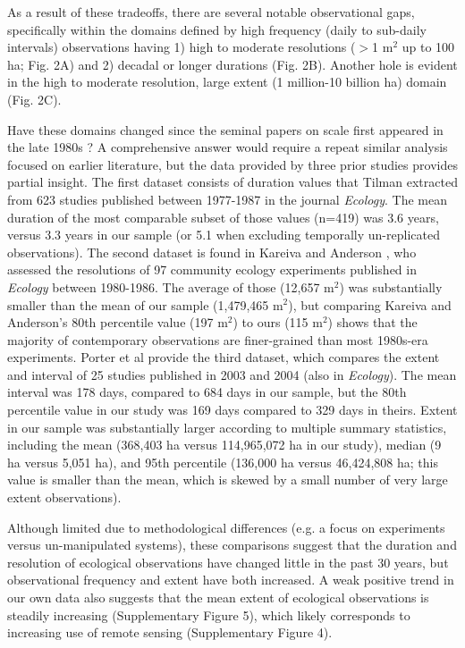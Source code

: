 \documentclass[12pt]{article}
\begin{document}
As a result of these tradeoffs, there are several notable observational gaps, specifically within the domains defined by high frequency (daily to sub-daily intervals) observations having 1) high to moderate resolutions ($>$1 m$^2$ up to 100 ha; Fig. 2A) and 2) decadal or longer durations (Fig. 2B).  Another hole is evident in the high to moderate resolution, large extent (1 million-10 billion ha) domain (Fig. 2C). 

Have these domains changed since the seminal papers on scale first appeared in the late 1980s \cite{wiens_spatial_1989, levin_problem_1992, tilman_ecological_1989}? A comprehensive answer would require a repeat similar analysis focused on earlier literature, but the data provided by three prior studies provides partial insight.  The first dataset consists of duration values that Tilman \cite{tilman_ecological_1989} extracted from 623 studies published between 1977-1987 in the journal \emph{Ecology}. The mean duration of the most comparable subset of those values (n=419) was 3.6 years, versus 3.3 years in our sample (or 5.1 when excluding temporally un-replicated observations). The second dataset is found in Kareiva and Anderson \cite{kareiva_spatial_1988}, who assessed the resolutions of 97 community ecology experiments published in \emph{Ecology} between 1980-1986. The average of those (12,657 m$^2$) was substantially smaller than the mean of our sample (1,479,465 m$^2$), but comparing Kareiva and Anderson's \cite{kareiva_spatial_1988} 80th percentile value (197 m$^2$) to ours (115 m$^2$) shows that the majority of contemporary observations are finer-grained than most 1980s-era experiments. Porter et al \cite{porter_wireless_2005} provide the third dataset, which compares the extent and interval of 25 studies published in 2003 and 2004 (also in \emph{Ecology}). The mean interval was 178 days, compared to 684 days in our sample, but the 80th percentile value in our study was 169 days compared to 329 days in theirs. Extent in our sample was substantially larger according to multiple summary statistics, including the mean (368,403 ha versus 114,965,072 ha in our study), median (9 ha versus 5,051 ha), and 95th percentile (136,000 ha versus 46,424,808 ha; this value is smaller than the mean, which is skewed by a small number of very large extent observations). 

Although limited due to methodological differences (e.g. a focus on experiments versus un-manipulated systems), these comparisons suggest that the duration and resolution of ecological observations have changed little in the past 30 years, but observational frequency and extent have both increased. A weak positive trend in our own data also suggests that the mean extent of ecological observations is steadily increasing (Supplementary Figure 5), which likely corresponds to increasing use of remote sensing (Supplementary Figure 4). 
\end{document}
